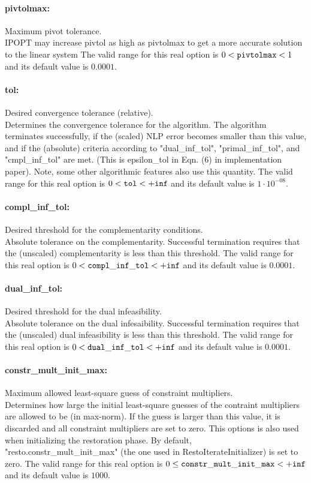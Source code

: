 \documentclass[letter,10pt]{article}
\begin{document}
\paragraph{pivtolmax:} Maximum pivot tolerance. $\;$ \\
 IPOPT may increase pivtol as high as pivtolmax to
get a more accurate solution to the linear system The valid range for this real option is 
$0 <  {\tt pivtolmax } <  1$
and its default value is $0.0001$.


\paragraph{tol:} Desired convergence tolerance (relative). $\;$ \\
 Determines the convergence tolerance for the
algorithm.  The algorithm terminates
successfully, if the (scaled) NLP error becomes
smaller than this value, and if the (absolute)
criteria according to "dual\_inf\_tol",
"primal\_inf\_tol", and "cmpl\_inf\_tol" are met.
 (This is epsilon\_tol in Eqn. (6) in
implementation paper). Note, some other
algorithmic features also use this quantity. The valid range for this real option is 
$0 <  {\tt tol } <  {\tt +inf}$
and its default value is $1 \cdot 10^{-08}$.


\paragraph{compl\_inf\_tol:} Desired threshold for the complementarity conditions. $\;$ \\
 Absolute tolerance on the complementarity.
Successful termination requires that the
(unscaled) complementarity is less than this
threshold. The valid range for this real option is 
$0 <  {\tt compl\_inf\_tol } <  {\tt +inf}$
and its default value is $0.0001$.


\paragraph{dual\_inf\_tol:} Desired threshold for the dual infeasibility. $\;$ \\
 Absolute tolerance on the dual infesaibility.
Successful termination requires that the
(unscaled) dual infeasibility is less than this
threshold. The valid range for this real option is 
$0 <  {\tt dual\_inf\_tol } <  {\tt +inf}$
and its default value is $0.0001$.


\paragraph{constr\_mult\_init\_max:} Maximum allowed least-square guess of constraint multipliers. $\;$ \\
 Determines how large the initial least-square
guesses of the contraint multipliers are allowed
to be (in max-norm). If the guess is larger than
this value, it is discarded and all constraint
multipliers are set to zero.  This options is
also used when initializing the restoration
phase. By default,
"resto.constr\_mult\_init\_max" (the one used in
RestoIterateInitializer) is set to zero. The valid range for this real option is 
$0 \le {\tt constr\_mult\_init\_max } <  {\tt +inf}$
and its default value is $1000$.
\end{document}
